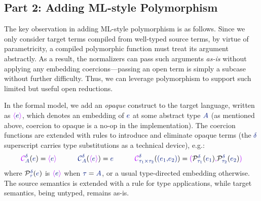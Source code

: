 
\subsection*{Part 2: Adding ML-style Polymorphism} %
\label{sec:parametricity}


The key observation in adding ML-style polymorphism is as
follows. Since we only consider target terms
compiled from well-typed source terms, by virtue of
parametricity, a compiled polymorphic function must treat its
argument abstractly. As a result, the normalizers can pass such
arguments \emph{as-is} without applying any embedding coercions---passing
an open term is simply a subcase without further
difficulty. Thus, we can leverage polymorphism to support such limited
but useful open reductions.

In the formal model, we add an \emph{opaque} construct to the target
language, written as
$\topaque\sexp$, which denotes an embedding of $\sexp$ at some
abstract type $\source{A}$ (as mentioned above, coercion to opaque is
a no-op in the implementation).
%
The coercion functions are extended
with rules to introduce and eliminate opaque terms (the $\sdelta$
superscript carries type substitutions as a technical device), e.g.:
\[
\begin{array}{c c c}
  \tcoerce{\svar{A}}{\sdelta}{\sexp}  = \topaque{\sexp}
  \quad & \quad
  \scoerce{\svar{A}}{\sdelta}{\topaque{\sexp}} = \sexp
  \quad
  &
  \quad
  \tcoerce{\sprod{\staui}{\stauii}}{\sdelta}{\spair{\sexpi}{\sexpii}} =
  \tpair{\prot{\source{e_1}}{\source{\tau_1}}{\sdelta}}{\prot{\source{e_2}}{\source{\tau_2}}{\sdelta}}
\end{array}
\]
where $\prot{\sexp}{\stau}{\sdelta}$ is $\topaque{\sexp}$ when
$\stau = \source{A}$, or a usual type-directed embedding otherwise. The source
semantics is 
extended with a rule for type applications, while target
semantics, being untyped, remains as-is.

